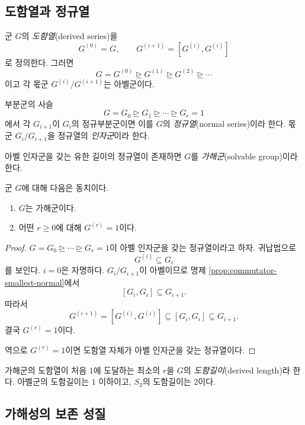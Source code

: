 \subsection{도함열과 정규열}

\begin{definition}[도함열]
군 $G$의 \emph{도함열}(derived series)을
\[
  G^{(0)}=G,
  \qquad
  G^{(i+1)}=[G^{(i)},G^{(i)}]
\]
로 정의한다. 그러면
\[
  G=G^{(0)}\trianglerighteq G^{(1)}
  \trianglerighteq G^{(2)}\trianglerighteq\cdots
\]
이고 각 몫군 $G^{(i)}/G^{(i+1)}$는 아벨군이다.
\end{definition}

\begin{definition}
부분군의 사슬
\[
  G=G_0\trianglerighteq G_1\trianglerighteq\cdots
  \trianglerighteq G_r=1
\]
에서 각 $G_{i+1}$이 $G_i$의 정규부분군이면 이를 $G$의 \emph{정규열}(normal series)이라 한다. 몫군 $G_i/G_{i+1}$을 정규열의 \emph{인자군}이라 한다.

아벨 인자군을 갖는 유한 길이의 정규열이 존재하면 $G$를 \emph{가해군}(solvable group)이라 한다.
\end{definition}

\begin{theorem}[도함열 판정]
\label{thm:derived-series-criterion}
군 $G$에 대해 다음은 동치이다.
\begin{enumerate}[label=(\roman*)]
  \item $G$는 가해군이다.
  \item 어떤 $r\ge0$에 대해 $G^{(r)}=1$이다.
\end{enumerate}
\end{theorem}

\begin{proof}
$G=G_0\trianglerighteq\cdots\trianglerighteq G_r=1$이 아벨 인자군을 갖는 정규열이라고 하자. 귀납법으로
\[
  G^{(i)}\subseteq G_i
\]
를 보인다. $i=0$은 자명하다. $G_i/G_{i+1}$이 아벨이므로 명제 \ref{prop:commutator-smallest-normal}에서
\[
  [G_i,G_i]\subseteq G_{i+1}.
\]
따라서
\[
  G^{(i+1)}=[G^{(i)},G^{(i)}]
  \subseteq [G_i,G_i]\subseteq G_{i+1}.
\]
결국 $G^{(r)}=1$이다.

역으로 $G^{(r)}=1$이면 도함열 자체가 아벨 인자군을 갖는 정규열이다.
\end{proof}

가해군의 도함열이 처음 $1$에 도달하는 최소의 $r$을 $G$의 \emph{도함길이}(derived length)라 한다. 아벨군의 도함길이는 $1$ 이하이고, $S_3$의 도함길이는 $2$이다.

\subsection{가해성의 보존 성질}

